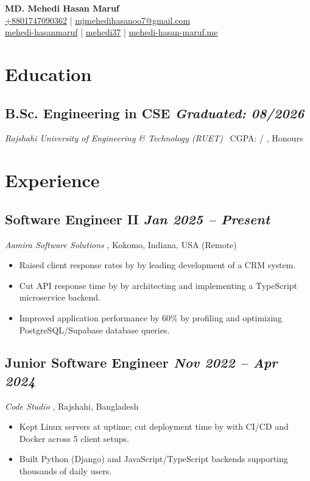 \documentclass[10pt, a4paper]{article}
\newcommand{\urlAamira}{https://aamira.ca/}
\newcommand{\urlCodeStudio}{https://www.linkedin.com/company/code-studio4/}
\newcommand{\datedsubsection}[2]{%
  \needspace{8\baselineskip}\subsection*{#1 \hfill \small\textit{#2}}%
}
\newcommand{\resitem}[1]{\item #1} %
\newcommand{\header}[6]{
  \begin{center}
    {\Huge\bfseries\color{primary} #1}\\[0.5em] %
    \small %
    \faPhone* \href{tel:#2}{#2} \quad | \quad
    \faEnvelope \href{mailto:#3}{\hspace{0.5mm}#3} \\
    \faLinkedin \href{#4}{\hspace{0.5mm}mehedi-hasanmaruf} \quad | \quad
    \faGithub \href{#5}{\hspace{0.5mm}mehedi37} \quad | \quad
    \faGlobe \href{#6}{\hspace{0.5mm}mehedi-hasan-maruf.me}
  \end{center}
}
\begin{document}
\color{primary} %
\header{MD. Mehedi Hasan Maruf}
       {+8801747090362}
       {mjmehedihasanoo7@gmail.com}
       {https://www.linkedin.com/in/mehedi-hasanmaruf}
       {https://github.com/mehedi37}
       {https://www.mehedi-hasan-maruf.me/}

\section{Education}
\datedsubsection{B.Sc. Engineering in CSE}{Graduated: 08/2026}
\textit{Rajshahi University of Engineering \& Technology (RUET)} \textbar\ CGPA: \factEduCgpa{} / \factEduScale{}, Honours

\section{Experience}
\datedsubsection{Software Engineer II}{Jan 2025 -- Present}
\textit{Aamira Software Solutions} \href{\urlAamira}{\small\faExternalLink*}, Kokomo, Indiana, USA (Remote)
\begin{itemize}
    \resitem{Raised client response rates by \factExpAamiraCrm{} by leading development of a CRM system.}
    \resitem{Cut API response time by \factExpAamiraApi{} by architecting and implementing a TypeScript microservice backend.}
    \resitem{Improved application performance by 60\% by profiling and optimizing PostgreSQL/Supabase database queries.}
\end{itemize}

\datedsubsection{Junior Software Engineer}{Nov 2022 -- Apr 2024}
\textit{Code Studio} \href{\urlCodeStudio}{\small\faExternalLink*}, Rajshahi, Bangladesh
\begin{itemize}
    \resitem{Kept \factExpCodestudioServers{} Linux servers at \factExpCodestudioUptime{} uptime; cut deployment time by \factExpCodestudioDeploy{} with CI/CD and Docker across 5 client setups.}
    \resitem{Built Python (Django) and JavaScript/TypeScript backends supporting thousands of daily users.}
\end{itemize}

\end{document}
